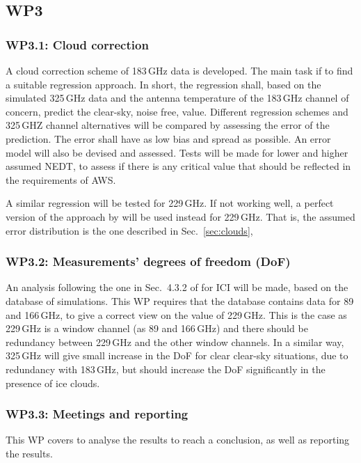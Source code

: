 \documentclass[BCOR=1cm,12pt,bibliography=totoc]{article}
\begin{document}
\subsection*{WP3}
%
\subsubsection*{WP3.1: Cloud correction}
%
A cloud correction scheme of 183\,GHz data is developed. The main task if to
find a suitable regression approach. In short, the regression shall, based on
the simulated 325\,GHz data and the antenna temperature of the 183\,GHz channel
of concern, predict the clear-sky, noise free, value. Different regression
schemes and 325\,GHZ channel alternatives will be compared by assessing the
error of the prediction. The error shall have as low bias and spread as
possible. An error model will also be devised and assessed. Tests will be made
for lower and higher assumed NEDT, to assess if there is any critical value
that should be reflected in the requirements of AWS.

A similar regression will be tested for 229\,GHz. If not working well, a
perfect version of the approach by \citet{rekha2012potential} will be used
instead for 229\,GHz. That is, the assumed error distribution is the one
described in Sec.~\ref{sec:clouds},


\subsubsection*{WP3.2: Measurements’ degrees of freedom (DoF)}
%
An analysis following the one in Sec.~4.3.2 of \citet[][]{eriksson:towar:20}
for ICI will be made, based on the database of simulations. This WP requires
that the database contains data for 89 and 166\,GHz, to give a correct view on
the value of 229\,GHz. This is the case as 229\,GHz is a window channel (as 89
and 166\,GHz) and there should be redundancy between 229\,GHz and the other
window channels. In a similar way, 325\,GHz will give small increase in the DoF
for clear clear-sky situations, due to redundancy with 183\,GHz, but should
increase the DoF significantly in the presence of ice clouds.  


\subsubsection*{WP3.3: Meetings and reporting}
%
This WP covers to analyse the results to reach a conclusion, as well as
reporting the results. 


{\footnotesize
 }



\end{document}
